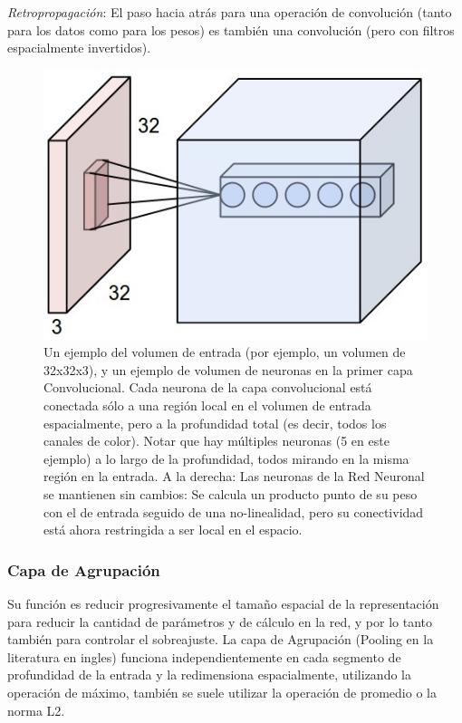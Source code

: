 \documentclass[a4paper,11pt,spanish]{book}
\begin{document}
	\emph{Retropropagación}: El paso hacia atrás para una operación de convolución (tanto para los datos como para los pesos) es también una convolución (pero con filtros espacialmente invertidos).
	\begin{figure}[H]
	  \begin{center}
	   \includegraphics[width=0.8\linewidth]{./img/stanford_conv_layer.jpeg}
	  \end{center}
	  \caption{Un ejemplo del volumen de entrada (por ejemplo, un volumen de 32x32x3), y un ejemplo de volumen de neuronas en la primer capa Convolucional.
	    Cada neurona de la capa convolucional está conectada sólo a una región local en el volumen de entrada espacialmente, pero a la profundidad total (es decir, todos
	    los canales de color). Notar que hay múltiples neuronas (5 en este ejemplo) a lo largo de la profundidad, todos mirando en la misma región en la entrada.
	    A la derecha: Las neuronas de la Red Neuronal se mantienen sin cambios: Se calcula un producto punto de su peso con el de entrada seguido de una no-linealidad,
	    pero su conectividad está ahora restringida a ser local en el espacio. \cite{Karpathy:Stanford}}
	  \label{fig:conv_layer}
	\end{figure}

      \subsubsection{Capa de Agrupación}
	Su función es reducir progresivamente el tamaño espacial de la representación para reducir la cantidad de parámetros y de cálculo en la red, y por lo tanto también para controlar
	el sobreajuste. La capa de Agrupación (Pooling en la literatura en ingles) funciona independientemente en cada segmento de profundidad de la entrada y la redimensiona espacialmente, utilizando la operación de máximo,
	también se suele utilizar la operación de promedio o la norma L2.\\
\end{document}
